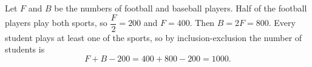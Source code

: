 Let $F$ and $B$ be the numbers of football and baseball players. Half of the football players play both sports, so $\dfrac F2=200$ and $F=400$. Then $B=2F=800$. Every student plays at least one of the sports, so by inclusion-exclusion the number of students is
\[F+B-200=400+800-200=\boxed{1000}.\]
